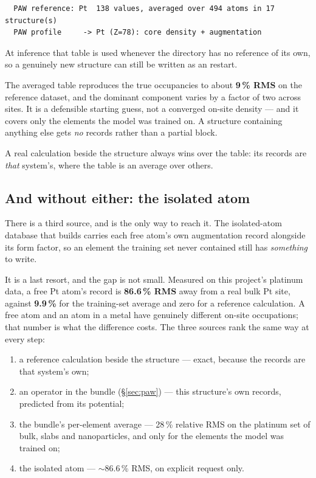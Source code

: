 \begin{lstlisting}
  PAW reference: Pt  138 values, averaged over 494 atoms in 17 structure(s)
  PAW profile     -> Pt (Z=78): core density + augmentation
\end{lstlisting}

At inference that table is used whenever the directory has no reference of its
own, so a genuinely new structure can still be written as an 
restart.

\begin{pwarn}
The averaged table reproduces the true occupancies to about \textbf{9\,\% RMS}
on the reference dataset, and the dominant component varies by a factor of two
across sites. It is a defensible starting guess, not a converged on-site
density --- and it covers only the elements the model was trained on. A
structure containing anything else gets \emph{no} records rather than a partial
block.
\end{pwarn}

A real calculation beside the structure always wins over the table: its records
are \emph{that} system's, where the table is an average over others.

\subsection{And without either: the isolated atom}

There is a third source, and  is the only way to
reach it. The isolated-atom database that  builds carries
each free atom's own augmentation record alongside its form factor, so an
element the training set never contained still has \emph{something} to write.

It is a last resort, and the gap is not small. Measured on this project's
platinum data, a free Pt atom's record is \textbf{86.6\,\% RMS} away from a
real bulk Pt site, against \textbf{9.9\,\%} for the training-set average and
zero for a reference calculation. A free atom and an atom in a metal have
genuinely different on-site occupations; that number is what the difference
costs. The three sources rank the same way at every step:

\begin{enumerate}
  \item a reference calculation beside the structure --- exact, because the
        records are that system's own;
  \item an  operator in the bundle (\S\ref{sec:paw}) --- this
        structure's own records, predicted from its potential;
  \item the bundle's per-element average --- 28\,\% relative RMS on the
        platinum set of bulk, slabs and nanoparticles, and only for the
        elements the model was trained on;
  \item the isolated atom --- $\sim$86.6\,\% RMS, on explicit request only.
\end{enumerate}

